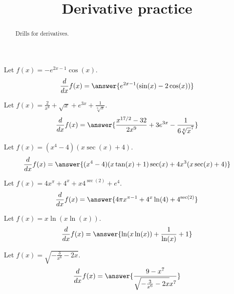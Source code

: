 \documentclass{ximera}
\title[Reinforce:]{Derivative practice}
\begin{document}
\begin{abstract}
  Drills for derivatives.
\end{abstract}
\maketitle


\begin{shuffle}


\begin{exercise}
Let $f(x)=-e^{2 x-1} \cos (x)$.
\[
\ddx f(x) = \answer{e^{2 x-1} (\sin (x)-2 \cos (x))}
\]
\end{exercise}

\begin{exercise}
Let $f(x)=\frac{2}{x^8}+\sqrt{x}+e^{3 x}+\frac{1}{\sqrt[6]{x}}$.
\[
\ddx f(x) = \answer{\frac{x^{17/2}-32}{2 x^9}+3 e^{3 x}-\frac{1}{6 \sqrt[6]{x}^7}}
\]
\end{exercise}

\begin{exercise}
Let $f(x)=(x^4-4) (x \sec (x)+4)$.
\[
\ddx f(x) = \answer{(x^4-4) (x \tan (x)+1) \sec (x)+4 x^3 (x \sec (x)+4)}
\]
\end{exercise}

\begin{exercise}
Let $f(x)=4 x^{\pi }+4^x+x 4^{\sec (2)}+e^4$.
\[
\ddx f(x) = \answer{4 \pi  x^{\pi -1}+4^x \ln (4)+4^{\sec (2)}}
\]
\end{exercise}



\begin{exercise}
Let $f(x)=x \ln (x \ln (x))$.
\[
\ddx f(x) = \answer{\ln (x \ln (x))+\frac{1}{\ln (x)}+1}
\]
\end{exercise}

\begin{exercise}
Let $f(x)=\sqrt{-\frac{3}{x^6}-2 x}$.
\[
\ddx f(x) = \answer{\frac{9-x^7}{\sqrt{-\frac{3}{x^6}-2 x} x^7}}
\]
\end{exercise}


\end{shuffle}
\end{document}
